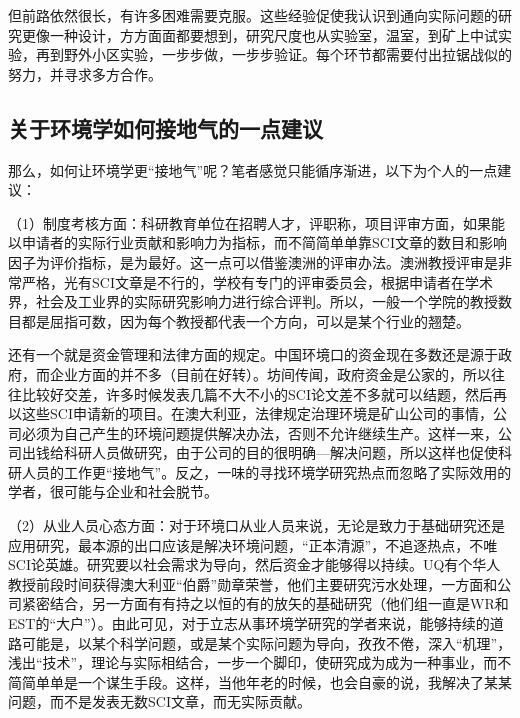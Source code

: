 \documentclass[]{book}
\begin{document}
但前路依然很长，有许多困难需要克服。这些经验促使我认识到通向实际问题的研究更像一种设计，方方面面都要想到，研究尺度也从实验室，温室，到矿上中试实验，再到野外小区实验，一步步做，一步步验证。每个环节都需要付出拉锯战似的努力，并寻求多方合作。

\hypertarget{ux5173ux4e8eux73afux5883ux5b66ux5982ux4f55ux63a5ux5730ux6c14ux7684ux4e00ux70b9ux5efaux8bae}{%
\subsection{关于环境学如何接地气的一点建议}\label{ux5173ux4e8eux73afux5883ux5b66ux5982ux4f55ux63a5ux5730ux6c14ux7684ux4e00ux70b9ux5efaux8bae}}

那么，如何让环境学更``接地气''呢？笔者感觉只能循序渐进，以下为个人的一点建议：

（1）制度考核方面：科研教育单位在招聘人才，评职称，项目评审方面，如果能以申请者的实际行业贡献和影响力为指标，而不简简单单靠SCI文章的数目和影响因子为评价指标，是为最好。这一点可以借鉴澳洲的评审办法。澳洲教授评审是非常严格，光有SCI文章是不行的，学校有专门的评审委员会，根据申请者在学术界，社会及工业界的实际研究影响力进行综合评判。所以，一般一个学院的教授数目都是屈指可数，因为每个教授都代表一个方向，可以是某个行业的翘楚。

还有一个就是资金管理和法律方面的规定。中国环境口的资金现在多数还是源于政府，而企业方面的并不多（目前在好转）。坊间传闻，政府资金是公家的，所以往往比较好交差，许多时候发表几篇不大不小的SCI论文差不多就可以结题，然后再以这些SCI申请新的项目。在澳大利亚，法律规定治理环境是矿山公司的事情，公司必须为自己产生的环境问题提供解决办法，否则不允许继续生产。这样一来，公司出钱给科研人员做研究，由于公司的目的很明确---解决问题，所以这样也促使科研人员的工作更``接地气''。反之，一味的寻找环境学研究热点而忽略了实际效用的学者，很可能与企业和社会脱节。

（2）从业人员心态方面：对于环境口从业人员来说，无论是致力于基础研究还是应用研究，最本源的出口应该是解决环境问题，``正本清源''，不追逐热点，不唯SCI论英雄。研究要以社会需求为导向，然后资金才能够得以持续。UQ有个华人教授前段时间获得澳大利亚``伯爵''勋章荣誉，他们主要研究污水处理，一方面和公司紧密结合，另一方面有有持之以恒的有的放矢的基础研究（他们组一直是WR和EST的``大户''）。由此可见，对于立志从事环境学研究的学者来说，能够持续的道路可能是，以某个科学问题，或是某个实际问题为导向，孜孜不倦，深入``机理''，浅出``技术''，理论与实际相结合，一步一个脚印，使研究成为成为一种事业，而不简简单单是一个谋生手段。这样，当他年老的时候，也会自豪的说，我解决了某某问题，而不是发表无数SCI文章，而无实际贡献。
\end{document}

